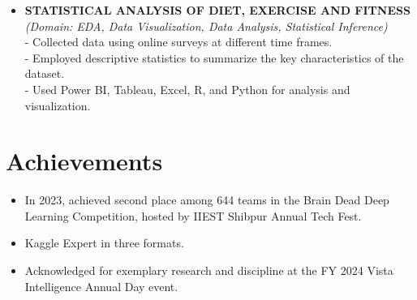 \documentclass[11pt,a4paper,sans]{moderncv}
\begin{document}
%
{\begin{itemize}[label=\textbullet]
\item {
\textbf{STATISTICAL ANALYSIS OF DIET, EXERCISE AND FITNESS} \href{https://github.com/U77w41/PDS-Project}{}\\ 
\textit{(Domain: EDA, Data Visualization, Data Analysis, Statistical Inference)} }
\\- Collected data using online surveys at different time frames.
\\- Employed descriptive statistics to summarize the key characteristics of the dataset.
\\- Used Power BI, Tableau, Excel, R, and Python for analysis and visualization.
\end{itemize}}


\section{Achievements}
{\begin{itemize}[label=\textbullet]
    \item In 2023, achieved second place among 644 teams in the Brain Dead Deep Learning Competition, hosted by IIEST Shibpur Annual Tech Fest.
    \item Kaggle Expert in three formats.
    \item Acknowledged for exemplary research and discipline at the FY 2024 Vista Intelligence Annual Day event.
\end{itemize}}

\end{document}
